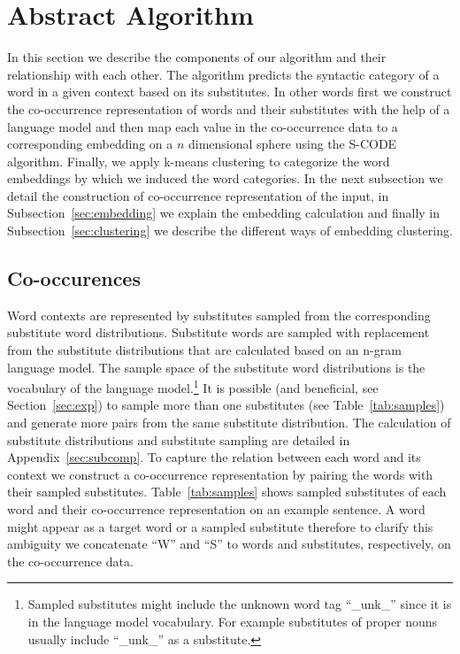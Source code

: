 \section{Abstract Algorithm}

In this section we describe the components of our algorithm and their
relationship with each other.  The algorithm predicts the syntactic
category of a word in a given context based on its substitutes.  In
other words first we construct the co-occurrence representation of
words and their substitutes with the help of a language model and then
map each value in the co-occurrence data to a corresponding embedding
on a $n$ dimensional sphere using the S-CODE algorithm.  Finally, we
apply k-means clustering to categorize the word embeddings by which we
induced the word categories.  In the next subsection we detail the
construction of co-occurrence representation of the input, in
Subsection~\ref{sec:embedding} we explain the embedding calculation and
finally in Subsection~\ref{sec:clustering} we describe the different ways of
embedding clustering.

\subsection{Co-occurences}
\label{sec:cooc}

Word contexts are represented by substitutes sampled from the
corresponding substitute word distributions.  Substitute words are
sampled with replacement from the substitute distributions that are
calculated based on an n-gram language model.  The sample space of the
substitute word distributions is the vocabulary of the language
model.\footnote{Sampled substitutes might include the unknown word tag
  ``\_unk\_'' since it is in the language model vocabulary.  For
  example substitutes of proper nouns usually include ``\_unk\_'' as a
  substitute.}  It is possible (and beneficial, see
Section~\ref{sec:exp}) to sample more than one substitutes (see
Table~\ref{tab:samples}) and generate more pairs from the same
substitute distribution.  The calculation of substitute distributions
and substitute sampling are detailed in Appendix~\ref{sec:subcomp}.
To capture the relation between each word and its context we construct
a co-occurrence representation by pairing the words with their sampled
substitutes.  Table~\ref{tab:samples} shows sampled substitutes of
each word and their co-occurrence representation on an example
sentence.  A word might appear as a target word or a sampled
substitute therefore to clarify this ambiguity we concatenate ``W''
and ``S'' to words and substitutes, respectively, on the co-occurrence
data.


